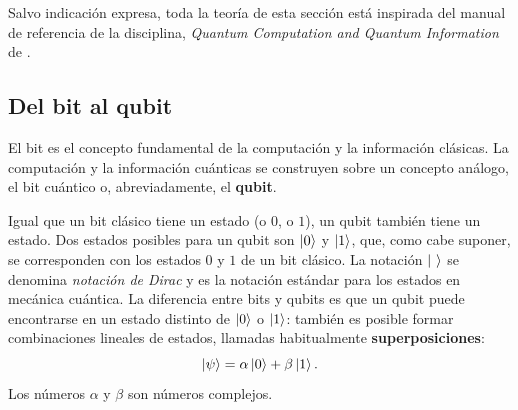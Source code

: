 



Salvo indicación expresa, toda la teoría de esta sección está inspirada del manual de referencia de
la disciplina, \emph{Quantum Computation and Quantum Information} de
.

\subsection{Del bit al qubit}
\label{sec:bit_qubit}
%
El bit es el concepto fundamental de la computación y la información clásicas. La
computación y la información cuánticas se construyen sobre un concepto análogo, el bit
cuántico o, abreviadamente, el \textbf{qubit}.

Igual que un bit clásico tiene un estado (o $0$, o $1$), un qubit
también tiene un estado. Dos estados posibles para un qubit son $\ket{0}$ y $\ket{1}$, que,
como cabe suponer, se corresponden con los estados $0$ y $1$ de un bit clásico. La notación
$\ket{\ }$ se denomina \textit{notación de Dirac} y es la
notación estándar para los estados en mecánica cuántica. La diferencia entre bits y qubits
es que un qubit puede encontrarse en un estado distinto de $\ket{0}$ o $\ket{1}$: también es
posible formar combinaciones lineales de estados, llamadas habitualmente
\textbf{superposiciones}:
\begin{equation}
\label{eq:superposicion}
\ket{\psi} = \alpha \ket{0} + \beta \ket{1}.
\end{equation}
Los números $\alpha$ y $\beta$ son números complejos.


